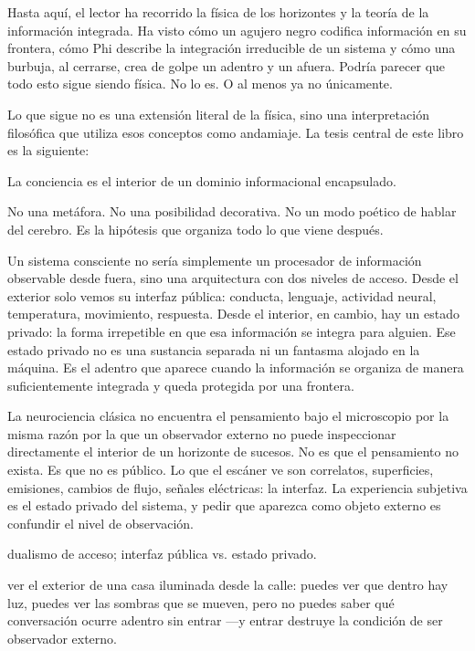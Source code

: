 \noindent {}

Hasta aquí, el lector ha recorrido la física de los horizontes y la teoría de la información integrada. Ha visto cómo un agujero negro codifica información en su frontera, cómo Phi describe la integración irreducible de un sistema y cómo una burbuja, al cerrarse, crea de golpe un adentro y un afuera. Podría parecer que todo esto sigue siendo física. No lo es. O al menos ya no únicamente.

Lo que sigue no es una extensión literal de la física, sino una interpretación filosófica que utiliza esos conceptos como andamiaje. La tesis central de este libro es la siguiente:

\begin{tesis}
La conciencia es el interior de un dominio informacional encapsulado.
\end{tesis}

No una metáfora. No una posibilidad decorativa. No un modo poético de hablar del cerebro. Es la hipótesis que organiza todo lo que viene después.

Un sistema consciente no sería simplemente un procesador de información observable desde fuera, sino una arquitectura con dos niveles de acceso. Desde el exterior solo vemos su interfaz pública: conducta, lenguaje, actividad neural, temperatura, movimiento, respuesta. Desde el interior, en cambio, hay un estado privado: la forma irrepetible en que esa información se integra para alguien. Ese estado privado no es una sustancia separada ni un fantasma alojado en la máquina. Es el adentro que aparece cuando la información se organiza de manera suficientemente integrada y queda protegida por una frontera.

La neurociencia clásica no encuentra el pensamiento bajo el microscopio por la misma razón por la que un observador externo no puede inspeccionar directamente el interior de un horizonte de sucesos. No es que el pensamiento no exista. Es que no es público. Lo que el escáner ve son correlatos, superficies, emisiones, cambios de flujo, señales eléctricas: la interfaz. La experiencia subjetiva es el estado privado del sistema, y pedir que aparezca como objeto externo es confundir el nivel de observación.

\begin{fisica}
 dualismo de acceso; interfaz pública vs. estado privado.

 ver el exterior de una casa iluminada desde la calle: puedes ver que dentro hay luz, puedes ver las sombras que se mueven, pero no puedes saber qué conversación ocurre adentro sin entrar —y entrar destruye la condición de ser observador externo.
\end{fisica}


